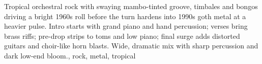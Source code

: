 

\begin{notes}
\end{notes}
\begin{prompt}
Tropical orchestral rock with swaying mambo-tinted groove, timbales and bongos driving a bright 1960s roll before the turn hardens into 1990s goth metal at a heavier pulse. %
Intro starts with grand piano and hand percussion; verses bring brass riffs; pre-drop strips to toms and low piano; final surge adds distorted guitars and choir-like horn blasts. %
Wide, dramatic mix with sharp percussion and dark low-end bloom., rock, metal, tropical
\end{prompt}
\sepbar


